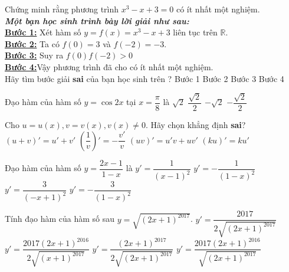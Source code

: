 \begin{ex}%
	Chứng minh rằng phương trình $ x^3-x+3=0 $ có ít nhất một nghiệm.\\
	\textbf{\textit{Một bạn học sinh trình bày lời giải như sau:}}	\\
	\textbf{\underline{Bước 1:}} Xét hàm số $ y=f(x) =x^3-x+3 $ liên tục trên $ \mathbb{R} $.\\
	\textbf{\underline{Bước 2:}} Ta có $ f(0)=3  $ và $ f(-2) =-3$.\\
	\textbf{\underline{Bước 3:}} Suy ra $ f(0)f(-2)>0 $\\
	\textbf{\underline{Bước 4:}}Vậy phương trình đã cho có ít nhất một nghiệm.\\
	Hãy tìm bước giải \textbf{sai} của bạn học sinh trên ?
	\choice
	{Bước 1}
	{Bước 2}
	{\True Bước 3}
	{Bước 4}
\end{ex}

\begin{ex}%
	Đạo hàm của hàm số $ y=\cos 2x $ tại $ x=\dfrac{\pi}{8} $ là
	\choice
	{$\sqrt{2}$}
	{$\dfrac{\sqrt{2}}{2}$}
	{\True $-\sqrt{2}$}
	{$-\dfrac{\sqrt{2}}{2}$}
\end{ex}

\begin{ex}%
	Cho $ u=u(x), v=v(x), v(x)\ne 0 $. Hãy chọn khẳng định \textbf{sai}?
	\choice
	{$(u+v)'=u'+v'$}
	{\True $\left(\dfrac{1}{v}\right)'=-\dfrac{v'}{v}$}
	{$(uv)'=u'v+uv'$}
	{$(ku)'=ku'$}
\end{ex}

\begin{ex}%
	Đạo hàm của hàm số $ y=\dfrac{2x-1}{1-x} $ là
	\choice
	{\True $y'=\dfrac{1}{(x-1)^2}$}
	{$y'=-\dfrac{1}{(1-x)^2}$}
	{$y'=\dfrac{3}{(-x+1)^2}$}
	{$y'=-\dfrac{3}{(1-x)^2}$}
\end{ex}

\begin{ex}%
	Tính đạo hàm của hàm số sau $ y=\sqrt{(2x+1)^{2017}}$.
	\choice
	{$y'=\dfrac{2017}{2\sqrt{(2x+1)^{2017}}}$}
	{$y'=\dfrac{2017(2x+1)^{2016}}{2\sqrt{(x+1)^{2017}}}$}
	{$y'=\dfrac{(2x+1)^{2017}}{2\sqrt{(2x+1)^{2017}}}$}
	{\True $y'=\dfrac{2017(2x+1)^{2016}}{\sqrt{(2x+1)^{2017}}}$}
\end{ex}

